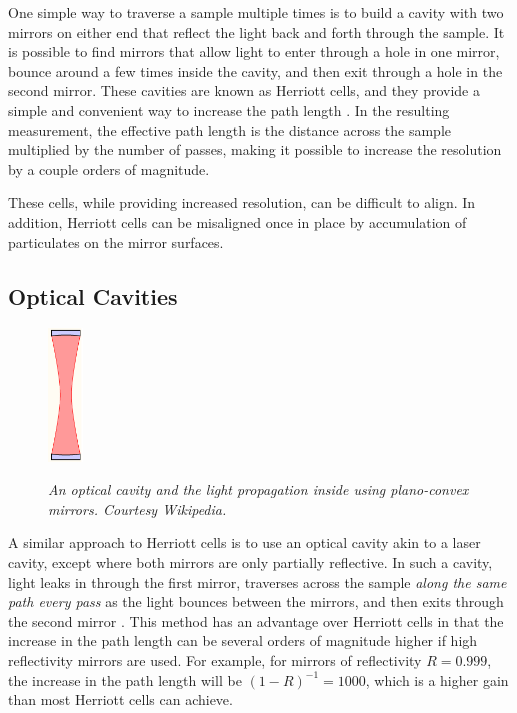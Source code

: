 One simple way to traverse a sample multiple times is to build a cavity with
two mirrors on either end that reflect the light back and forth through the
sample. It is possible to find mirrors that allow light to enter through a hole
in one mirror, bounce around a few times inside the cavity, and then exit
through a hole in the second mirror. These cavities are known as Herriott
cells, and they provide a simple and convenient way to increase the path
length \cite{Engel:2007va}. In the resulting measurement, the effective path
length is the distance across the sample multiplied by the number of passes,
making it possible to increase the resolution by a couple orders of magnitude.

These cells, while providing increased resolution, can be difficult to align.
In addition, Herriott cells can be misaligned once in place by accumulation of
particulates on the mirror surfaces.



\subsection{Optical Cavities}\label{subsec:cavity}


\begin{figure}
\begin{center}
  \includegraphics[height=100pt]{figures/cavity.png}
\end{center}
\emph{\footnotesize{An optical cavity and the light propagation inside using plano-convex mirrors. Courtesy Wikipedia.}}
\end{figure}

A similar approach to  Herriott cells is to use an optical cavity akin to a
laser cavity, except where both mirrors are only partially reflective. In such
a cavity, light leaks in through the first mirror, traverses across the sample
\emph{along the same path every pass} as the light bounces between the mirrors,
and then exits through the second mirror \cite{Berden:2009wk}. This method has an advantage over
Herriott cells in that the increase in the path length can be several orders of
magnitude higher if high reflectivity mirrors are used. For example, for
mirrors of reflectivity $R=0.999$, the increase in the path length will be
$(1-R)^{-1} = 1000$, which is a higher gain than most Herriott cells can
achieve.

